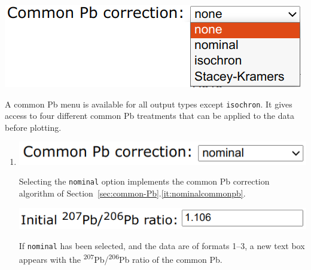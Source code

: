 \begin{refsection}
\begin{enumerate}
\noindent\begin{minipage}[t]{.4\linewidth}
\strut\vspace*{-\baselineskip}\newline
\includegraphics[width=\linewidth]{../figures/CommonPb.png}
\end{minipage}
\begin{minipage}[t]{.6\linewidth}
  A common Pb menu is available for all output types except
  \texttt{isochron}. It gives access to four different common Pb
  treatments that can be applied to the data before plotting.
\end{minipage}

\begin{enumerate}
\item\begin{minipage}[t]{.4\linewidth}
  \strut\vspace*{-\baselineskip}\newline
  \includegraphics[width=\linewidth]{../figures/nominalcommonpb.png}
  \end{minipage}
  \begin{minipage}[t]{.6\linewidth}
    Selecting the \texttt{nominal} option implements the common Pb
    correction algorithm of
    Section~\ref{sec:common-Pb}.\ref{it:nominalcommonpb}.
  \end{minipage}

  \noindent\begin{minipage}[t]{.4\linewidth}
  \strut\vspace*{-\baselineskip}\newline
  \includegraphics[width=\linewidth]{../figures/initialPb76.png}
  \end{minipage}
  \begin{minipage}[t]{.6\linewidth}
    If \texttt{nominal} has been selected, and the data are of formats
    1--3, a new text box appears with the
    \textsuperscript{207}Pb/\textsuperscript{206}Pb ratio of the
    common Pb.
  \end{minipage}


\end{enumerate}
\end{enumerate}
\end{refsection}
